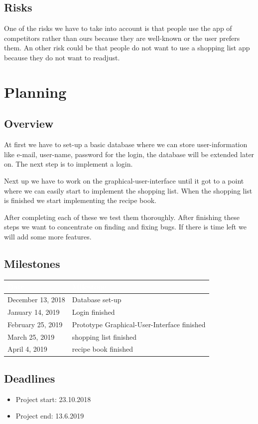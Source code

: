 \documentclass[12pt]{article}
\theoremstyle{definition}
\begin{document}
\subsection{Risks}
One of the risks we have to take into account is that people use the app of competitors rather than ours because they are well-known or the user prefers them. An other risk could be that people do not want to use a shopping list app because they do not want to readjust.

\pagebreak

\section{Planning}
\subsection{Overview}
At first we have to set-up a basic database where we can store user-information like e-mail, user-name, password for the login, the database will be extended later on. The next step is to implement a login.

Next up we have to work on the graphical-user-interface until it got to a point where we can easily start to implement the shopping list. When the shopping list is finished we start implementing the recipe book.

After completing each of these we test them thoroughly. After finishing these steps we want to concentrate on finding and fixing bugs. If there is time left we will add some more features.

\subsection{Milestones}
\begin{tabular}{|l|l|}
\hline
\cellcolor[gray]{0.5}\textcolor{white}{Date} &
\cellcolor[gray]{0.5}\textcolor{white}{Milestone} \\ \hline
December 13, 2018 & Database set-up \\ \hline
January 14, 2019 & Login finished \\ \hline
February 25, 2019 & Prototype Graphical-User-Interface finished \\ \hline
March 25, 2019 & shopping list finished \\ \hline
April 4, 2019 & recipe book finished \\ \hline
\end{tabular}

\subsection{Deadlines}
\begin{itemize}
\item Project start: 23.10.2018
\item Project end: 13.6.2019
\end{itemize}
\end{document}
